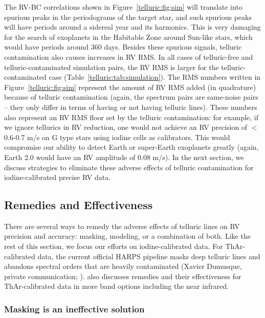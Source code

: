 The RV-BC correlations shown in Figure~\ref{telluric:fig:sim} will
translate into spurious peaks in the periodograms of the target star,
and such spurious peaks will have periods around a sidereal year and
its harmonics. This is very damaging for the search of exoplanets in
the Habitable Zone around Sun-like stars, which would have periods
around 360 days. Besides these spurious signals, telluric
contamination also causes increases in RV RMS. In all cases of
telluric-free and telluric-contaminated simulation pairs, the RV RMS
is larger for the telluric-contaminated case
(Table~\ref{telluric:tab:simulation}). The RMS numbers written in
Figure~\ref{telluric:fig:sim} represent the amount of RV RMS added (in
quadrature) because of telluric contamination (again, the spectrum
pairs are same-noise pairs -- they only differ in terms of having or
not having telluric lines). These numbers also represent an RV RMS
floor set by the telluric contamination: for example, if we ignore
tellurics in RV reduction, one would not achieve an RV precision of
$<$0.6-0.7 m/s on G type stars using iodine cells as calibrators. This
would compromise our ability to detect Earth or super-Earth exoplanets
greatly (again, Earth 2.0 would have an RV amplitude of 0.08 m/s). In
the next section, we discuss strategies to eliminate these adverse
effects of telluric contamination for iodine-calibrated precise RV
data.


\subsection{Remedies and Effectiveness}\label{keck:telluric:remedies}

There are several ways to remedy the adverse effects of telluric lines
on RV precision and accuracy: masking, modeling, or a combination of
both. Like the rest of this section, we focus our efforts on
iodine-calibrated data. For ThAr-calibrated data, the current official
HARPS pipeline masks deep telluric lines and abandons spectral orders
that are heavily contaminated (Xavier Dumusque, private communication;
\citealt{artigau2014}). \cite{2016AAS...22713719S} also discusses
remedies and their effectiveness for ThAr-calibrated data in more band
options including the near infrared.

\subsubsection{Masking is an ineffective solution}\label{keck:telluric:masking}

